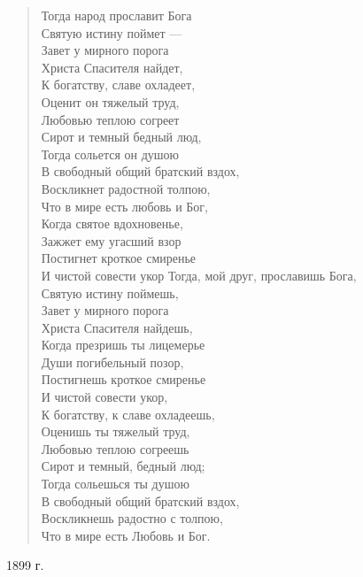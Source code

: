 \newpage
\vspace*{0cm}


\begin{verse}
Тогда народ прославит Бога\\
Святую истину поймет ---\\
Завет у мирного порога\\
Христа Спасителя найдет,\\
К богатству, славе охладеет,\\
Оценит он тяжелый труд,\\
Любовью теплою согреет\\
Сирот и темный бедный люд,\\
Тогда сольется он душою\\
В свободный общий братский вздох,\\
Воскликнет радостной толпою,\\
Что в мире есть любовь и Бог,\\
Когда святое вдохновенье,\\
Зажжет ему угасший взор\ldotst\\
Постигнет кроткое смиренье\\
И чистой совести укор\ldotst
Тогда, мой друг, прославишь Бога,\\
    Святую истину поймешь, \\
Завет у мирного порога\\
    Христа Спасителя найдешь, \\
Когда презришь ты лицемерье\\
    Души погибельный позор,\\
Постигнешь кроткое смиренье\\
    И чистой совести укор,\\
К богатству, к славе охладеешь,\\
    Оценишь ты тяжелый труд,\\
Любовью теплою согреешь\\
    Сирот и темный, бедный люд;\\
Тогда сольешься ты душою\\
    В свободный общий братский вздох,\\
Воскликнешь радостно с толпою,\\
    Что в мире есть Любовь и Бог.
\fi
\end{verse}
1899 г.

